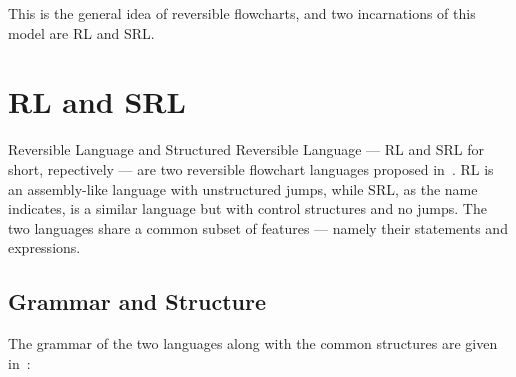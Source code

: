 
\noindent This is the general idea of reversible flowcharts, and two incarnations of this model are RL and SRL.\



\section*{RL and SRL}
\noindent Reversible Language and Structured Reversible Language --- RL and SRL for short, repectively --- are two reversible flowchart languages proposed in~\cite{REV}. RL is an assembly-like language with unstructured jumps, while SRL, as the name indicates, is a similar language but with control structures and no jumps. The two languages share a common subset of features --- namely their statements and expressions.

\subsection*{Grammar and Structure}

The grammar of the two languages along with the common structures are given in~\cite{REV}:\\

